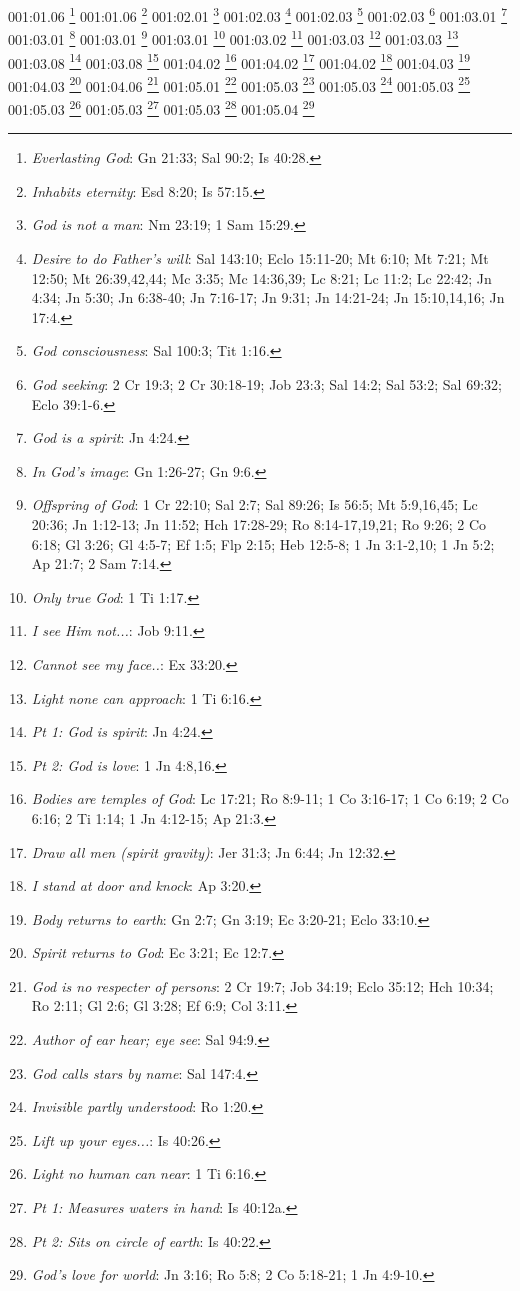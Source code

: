 {001:01.06 \footnote{\textit{Everlasting God}: Gn 21:33; Sal 90:2; Is 40:28.}
001:01.06 \footnote{\textit{Inhabits eternity}: Esd 8:20; Is 57:15.}
001:02.01 \footnote{\textit{God is not a man}: Nm 23:19; 1 Sam 15:29.}
001:02.03 \footnote{\textit{Desire to do Father's will}: Sal 143:10; Eclo 15:11-20; Mt 6:10; Mt 7:21; Mt 12:50; Mt 26:39,42,44; Mc 3:35; Mc 14:36,39; Lc 8:21; Lc 11:2; Lc 22:42; Jn 4:34; Jn 5:30; Jn 6:38-40; Jn 7:16-17; Jn 9:31; Jn 14:21-24; Jn 15:10,14,16; Jn 17:4.}
001:02.03 \footnote{\textit{God consciousness}: Sal 100:3; Tit 1:16.}
001:02.03 \footnote{\textit{God seeking}: 2 Cr 19:3; 2 Cr 30:18-19; Job 23:3; Sal 14:2; Sal 53:2; Sal 69:32; Eclo 39:1-6.}
001:03.01 \footnote{\textit{God is a spirit}: Jn 4:24.}
001:03.01 \footnote{\textit{In God's image}: Gn 1:26-27; Gn 9:6.}
001:03.01 \footnote{\textit{Offspring of God}: 1 Cr 22:10; Sal 2:7; Sal 89:26; Is 56:5; Mt 5:9,16,45; Lc 20:36; Jn 1:12-13; Jn 11:52; Hch 17:28-29; Ro 8:14-17,19,21; Ro 9:26; 2 Co 6:18; Gl 3:26; Gl 4:5-7; Ef 1:5; Flp 2:15; Heb 12:5-8; 1 Jn 3:1-2,10; 1 Jn 5:2; Ap 21:7; 2 Sam 7:14.}
001:03.01 \footnote{\textit{Only true God}: 1 Ti 1:17.}
001:03.02 \footnote{\textit{I see Him not...}: Job 9:11.}
001:03.03 \footnote{\textit{Cannot see my face..}: Ex 33:20.}
001:03.03 \footnote{\textit{Light none can approach}: 1 Ti 6:16.}
001:03.08 \footnote{\textit{Pt 1: God is spirit}: Jn 4:24.}
001:03.08 \footnote{\textit{Pt 2: God is love}: 1 Jn 4:8,16.}
001:04.02 \footnote{\textit{Bodies are temples of God}: Lc 17:21; Ro 8:9-11; 1 Co 3:16-17; 1 Co 6:19; 2 Co 6:16; 2 Ti 1:14; 1 Jn 4:12-15; Ap 21:3.}
001:04.02 \footnote{\textit{Draw all men (spirit gravity)}: Jer 31:3; Jn 6:44; Jn 12:32.}
001:04.02 \footnote{\textit{I stand at door and knock}: Ap 3:20.}
001:04.03 \footnote{\textit{Body returns to earth}: Gn 2:7; Gn 3:19; Ec 3:20-21; Eclo 33:10.}
001:04.03 \footnote{\textit{Spirit returns to God}: Ec 3:21; Ec 12:7.}
001:04.06 \footnote{\textit{God is no respecter of persons}: 2 Cr 19:7; Job 34:19; Eclo 35:12; Hch 10:34; Ro 2:11; Gl 2:6; Gl 3:28; Ef 6:9; Col 3:11.}
001:05.01 \footnote{\textit{Author of ear hear; eye see}: Sal 94:9.}
001:05.03 \footnote{\textit{God calls stars by name}: Sal 147:4.}
001:05.03 \footnote{\textit{Invisible partly understood}: Ro 1:20.}
001:05.03 \footnote{\textit{Lift up your eyes...}: Is 40:26.}
001:05.03 \footnote{\textit{Light no human can near}: 1 Ti 6:16.}
001:05.03 \footnote{\textit{Pt 1: Measures waters in hand}: Is 40:12a.}
001:05.03 \footnote{\textit{Pt 2: Sits on circle of earth}: Is 40:22.}
001:05.04 \footnote{\textit{God's love for world}: Jn 3:16; Ro 5:8; 2 Co 5:18-21; 1 Jn 4:9-10.}
}

